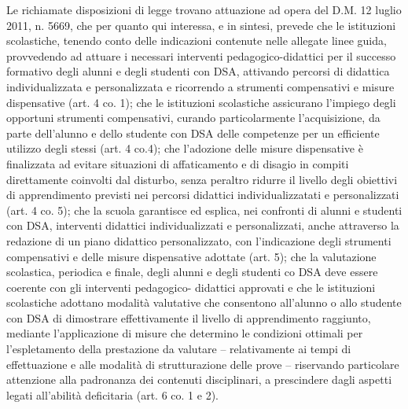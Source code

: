  Le richiamate disposizioni di legge trovano attuazione ad opera del D.M. 12 luglio 2011, n. 5669, che per quanto qui interessa, e in sintesi, prevede che le istituzioni scolastiche, tenendo conto delle indicazioni contenute nelle allegate linee guida, provvedendo ad attuare i necessari interventi pedagogico-didattici per il successo formativo degli alunni e degli studenti con DSA, attivando percorsi di didattica individualizzata e personalizzata e ricorrendo a strumenti compensativi e misure dispensative (art. 4 co. 1); che le istituzioni scolastiche assicurano l'impiego degli opportuni strumenti compensativi, curando particolarmente l'acquisizione, da parte dell'alunno e dello studente con DSA delle competenze per un efficiente utilizzo degli stessi (art. 4 co.4); che l'adozione delle misure dispensative è finalizzata ad evitare situazioni di affaticamento e di disagio in compiti direttamente coinvolti dal disturbo, senza peraltro ridurre il livello degli obiettivi di apprendimento previsti nei percorsi didattici individualizzatati e personalizzati (art. 4 co. 5); che la scuola garantisce ed esplica, nei confronti di alunni e studenti con DSA, interventi didattici individualizzati e personalizzati, anche attraverso la redazione di un piano didattico personalizzato, con l'indicazione degli strumenti compensativi e delle misure dispensative adottate (art. 5); che la valutazione scolastica, periodica e finale, degli alunni e degli studenti co DSA deve essere coerente con gli interventi pedagogico- didattici approvati e che le istituzioni scolastiche adottano modalità valutative che consentono all'alunno o allo studente con DSA di dimostrare effettivamente il livello di apprendimento raggiunto, mediante l'applicazione di misure che determino le condizioni ottimali per l'espletamento della prestazione da valutare -- relativamente ai tempi di effettuazione e alle modalità di strutturazione delle prove -- riservando particolare attenzione alla padronanza dei contenuti disciplinari, a prescindere dagli aspetti legati all'abilità deficitaria (art. 6 co. 1 e 2).
 
